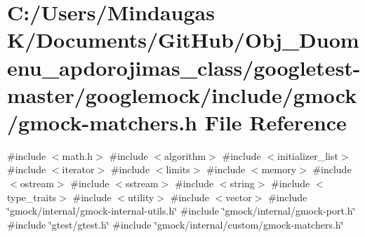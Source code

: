 \hypertarget{googletest-master_2googlemock_2include_2gmock_2gmock-matchers_8h}{}\section{C\+:/\+Users/\+Mindaugas K/\+Documents/\+Git\+Hub/\+Obj\+\_\+\+Duomenu\+\_\+apdorojimas\+\_\+class/googletest-\/master/googlemock/include/gmock/gmock-\/matchers.h File Reference}
\label{googletest-master_2googlemock_2include_2gmock_2gmock-matchers_8h}
{\ttfamily \#include $<$math.\+h$>$}\newline
{\ttfamily \#include $<$algorithm$>$}\newline
{\ttfamily \#include $<$initializer\+\_\+list$>$}\newline
{\ttfamily \#include $<$iterator$>$}\newline
{\ttfamily \#include $<$limits$>$}\newline
{\ttfamily \#include $<$memory$>$}\newline
{\ttfamily \#include $<$ostream$>$}\newline
{\ttfamily \#include $<$sstream$>$}\newline
{\ttfamily \#include $<$string$>$}\newline
{\ttfamily \#include $<$type\+\_\+traits$>$}\newline
{\ttfamily \#include $<$utility$>$}\newline
{\ttfamily \#include $<$vector$>$}\newline
{\ttfamily \#include \char`\"{}gmock/internal/gmock-\/internal-\/utils.\+h\char`\"{}}\newline
{\ttfamily \#include \char`\"{}gmock/internal/gmock-\/port.\+h\char`\"{}}\newline
{\ttfamily \#include \char`\"{}gtest/gtest.\+h\char`\"{}}\newline
{\ttfamily \#include \char`\"{}gmock/internal/custom/gmock-\/matchers.\+h\char`\"{}}\newline
